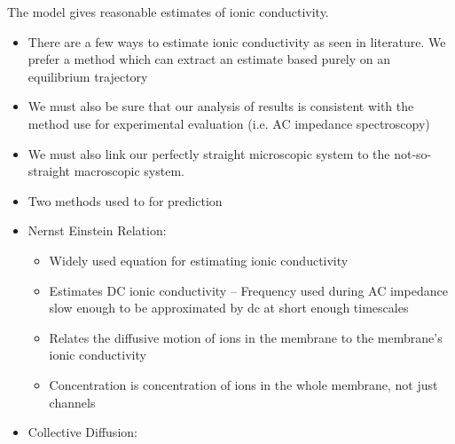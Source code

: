 \documentclass{article}
\begin{document}
	The model gives reasonable estimates of ionic conductivity.
	\begin{itemize}
		\item There are a few ways to estimate ionic conductivity as seen in literature. We prefer a method which can extract an estimate based purely on an equilibrium trajectory
		\item We must also be sure that our analysis of results is consistent with the method use for experimental evaluation (i.e. AC impedance spectroscopy)
		\item We must also link our perfectly straight microscopic system to the not-so-straight macroscopic system. %
		\item Two methods used to for prediction
		\item Nernst Einstein Relation:
		\begin{itemize}
			\item Widely used equation for estimating ionic conductivity
			\item Estimates DC ionic conductivity -- Frequency used during AC impedance slow enough to be approximated by dc at short enough timescales
			\item Relates the diffusive motion of ions in the membrane to the membrane's ionic conductivity
			\item Concentration is concentration of ions in the whole membrane, not just channels
		\end{itemize}
		\item Collective Diffusion:  %

\end{itemize}
\end{document}
